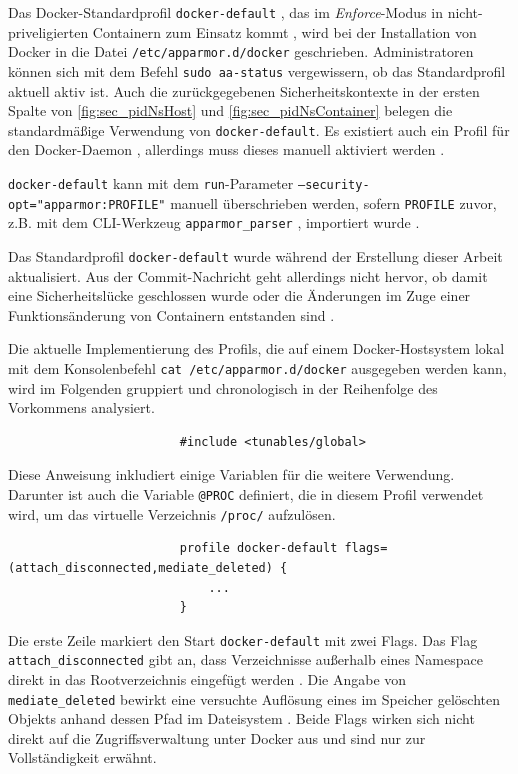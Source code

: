 \documentclass[../main.tex]{subfiles}
\begin{document}
				Das Docker-Standardprofil \texttt{docker-default} \cite{githubAppArmorProfileContainer}, das im \emph{Enforce}-Modus in nicht-priveligierten Containern zum Einsatz kommt \cite{docker110Security}, wird bei der Installation von Docker in die Datei \texttt{/etc/apparmor.d/docker} geschrieben. Administratoren können sich mit dem Befehl \texttt{sudo aa-status} vergewissern, ob das Standardprofil aktuell aktiv ist. Auch die zurückgegebenen Sicherheitskontexte in der ersten Spalte von \fig \ref{fig:sec_pidNsHost} und \fig \ref{fig:sec_pidNsContainer} belegen die standardmäßige Verwendung von \texttt{docker-default}. Es existiert auch ein Profil für den Docker-Daemon \cite{githubAppArmorProfileDaemon}, allerdings muss dieses manuell aktiviert werden \cite{githubAppArmorDoc}.

				\texttt{docker-default} kann mit dem \texttt{run}-Parameter \texttt{--security-opt="{}apparmor:PROFILE"{}} manuell überschrieben werden, sofern \texttt{PROFILE} zuvor, z.B. mit dem \acrshort{CLI}-Werkzeug \texttt{apparmor\_parser} \cite{apparmorParser}, importiert wurde \cite{dockerRun}.


					Das Standardprofil \texttt{docker-default} wurde während der Erstellung dieser Arbeit aktualisiert. Aus der Commit-Nachricht geht allerdings nicht hervor, ob damit eine Sicherheitslücke geschlossen wurde oder die Änderungen im Zuge einer Funktionsänderung von Containern entstanden sind \cite{githubAppArmorProfileContainerFix}.

					Die aktuelle Implementierung des Profils, die auf einem Docker-Hostsystem lokal mit dem Konsolenbefehl \texttt{cat /etc/apparmor.d/docker} ausgegeben werden kann, wird im Folgenden gruppiert und chronologisch in der Reihenfolge des Vorkommens analysiert.

					\begin{lstlisting}
						#include <tunables/global>
					\end{lstlisting}
					Diese Anweisung inkludiert einige Variablen für die weitere Verwendung. Darunter ist auch die Variable \texttt{@{PROC}} definiert, die in diesem Profil verwendet wird, um das virtuelle Verzeichnis \texttt{/proc/} aufzulösen.

					\begin{lstlisting}
						profile docker-default flags=(attach_disconnected,mediate_deleted) {
							...
						}
					\end{lstlisting}
					Die erste Zeile markiert den Start \texttt{docker-default} mit zwei Flags. Das Flag \texttt{attach\_disconnected} gibt an, dass Verzeichnisse außerhalb eines Namespace direkt in das Rootverzeichnis eingefügt werden \cite{apparmorPolicyReference}. Die Angabe von \texttt{mediate\_deleted} bewirkt eine versuchte Auflösung eines im Speicher gelöschten Objekts anhand dessen Pfad im Dateisystem \cite{apparmorFAQ}. Beide Flags wirken sich nicht direkt auf die Zugriffsverwaltung unter Docker aus und sind nur zur Vollständigkeit erwähnt.
\end{document}
